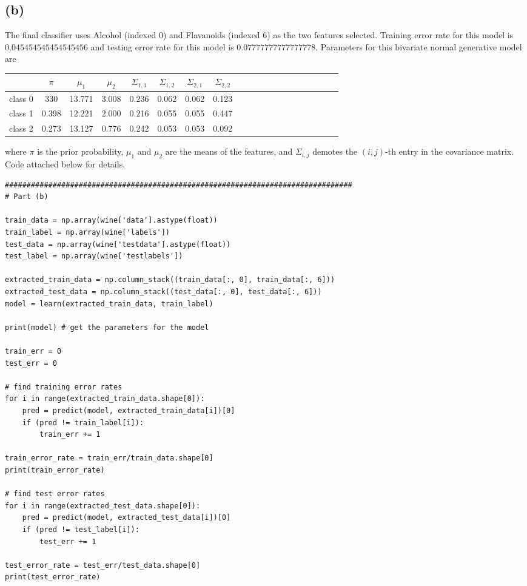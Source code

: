 \documentclass[11pt]{article}
\begin{document}
\subsection*{(b)}
The final classifier uses Alcohol (indexed 0) and Flavanoids (indexed 6) as the two features selected. Training error rate for this model is $0.045454545454545456$ and testing error rate for this model is $0.07777777777777778$. Parameters for this bivariate normal generative model are
\begin{center}
    \begin{tabular}{*{20}{|c}}
      \hline
   & $\pi$ & $\mu_1$ & $\mu_2$ & $\Sigma_{1,1}$ & $\Sigma_{1,2}$ & $\Sigma_{2,1}$ & $\Sigma_{2,2}$ \\ 
  \hline
  class 0 & 330 & 13.771 & 3.008 & 0.236 & 0.062 & 0.062 & 0.123 \\ 
  \hline
  class 1 & 0.398 & 12.221 & 2.000 & 0.216 & 0.055 & 0.055 & 0.447 \\ 
  \hline
  class 2 & 0.273 & 13.127 & 0.776 & 0.242 & 0.053 & 0.053 & 0.092 \\ 
  \hline
    \end{tabular}
\end{center}
where $\pi$ is the prior probability, $\mu_1$ and $\mu_2$ are the means of the features, and $\Sigma_{i,j}$ demotes the $(i,j)$-th entry in the covariance matrix. \\
Code attached below for details.
\begin{verbatim}
################################################################################
# Part (b)

train_data = np.array(wine['data'].astype(float))
train_label = np.array(wine['labels'])
test_data = np.array(wine['testdata'].astype(float))
test_label = np.array(wine['testlabels'])

extracted_train_data = np.column_stack((train_data[:, 0], train_data[:, 6]))
extracted_test_data = np.column_stack((test_data[:, 0], test_data[:, 6]))
model = learn(extracted_train_data, train_label)

print(model) # get the parameters for the model

train_err = 0
test_err = 0

# find training error rates
for i in range(extracted_train_data.shape[0]):
    pred = predict(model, extracted_train_data[i])[0]
    if (pred != train_label[i]):
        train_err += 1

train_error_rate = train_err/train_data.shape[0]
print(train_error_rate)

# find test error rates
for i in range(extracted_test_data.shape[0]):
    pred = predict(model, extracted_test_data[i])[0]
    if (pred != test_label[i]):
        test_err += 1

test_error_rate = test_err/test_data.shape[0]
print(test_error_rate)
\end{verbatim}
\end{document}
